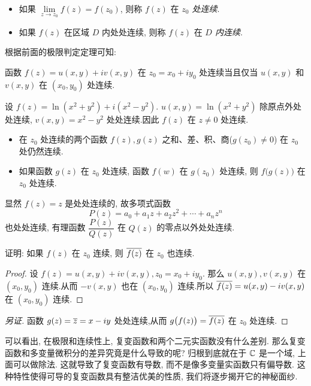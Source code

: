 \begin{definition}[连续]
  \begin{itemize}
    \item 如果 $\lim\limits_{z\to z_0}f(z)=f(z_0)$, 则称 $f(z)$ 在 \emph{$z_0$ 处连续}.
    \item 如果 $f(z)$ 在区域 $D$ 内处处连续, 则称 $f(z)$ 在 \emph{$D$ 内连续}.
  \end{itemize}
\end{definition}

根据前面的极限判定定理可知:
\begin{theorem}[连续的等价刻画]
  函数 $f(z)=u(x,y)+iv(x,y)$ 在 $z_0=x_0+iy_0$ 处连续当且仅当 $u(x,y)$ 和 $v(x,y)$ 在 $(x_0,y_0)$ 处连续.
\end{theorem}

\begin{example}
  设 $f(z)=\ln(x^2+y^2)+i(x^2-y^2)$.
  $u(x,y)=\ln(x^2+y^2)$ 除原点外处处连续, $v(x,y)=x^2-y^2$ 处处连续.因此 $f(z)$ 在 $z\neq0$ 处连续.
\end{example}

\begin{theorem}[连续函数的四则运算和复合]
  \begin{itemize}
    \item 在 $z_0$ 处连续的两个函数 $f(z),g(z)$ 之和、差、积、商($g(z_0)\neq 0$) 在 $z_0$ 处仍然连续.
    \item 如果函数 $g(z)$ 在 $z_0$ 处连续, 函数 $f(w)$ 在 $g(z_0)$ 处连续, 则 $f\bigl(g(z)\bigr)$ 在 $z_0$ 处连续.
  \end{itemize}
\end{theorem}

显然 $f(z)=z$ 是处处连续的, 故多项式函数
\[P(z)=a_0+a_1z+a_2z^2+\cdots+a_nz^n\]
也处处连续, 有理函数 $\dfrac{P(z)}{Q(z)}$ 在 $Q(z)$ 的零点以外处处连续.

\begin{example}
  证明: 如果 $f(z)$ 在 $z_0$ 连续, 则 $\overline{f(z)}$ 在 $z_0$ 也连续.
\end{example}

\begin{proof}
  设 $f(z)=u(x,y)+iv(x,y),z_0=x_0+iy_0$.
  那么 $u(x,y),v(x,y)$ 在 $(x_0,y_0)$ 连续.从而 $-v(x,y)$ 也在 $(x_0,y_0)$ 连续.所以 $\overline{f(z)}=u(x,y)-iv(x,y)$ 在 $(x_0,y_0)$ 连续.
\end{proof}
\begin{proof}[另证]
  函数 $g(z)=\overline z=x-iy$ 处处连续,从而 $g\bigl(f(z)\bigr)=\overline{f(z)}$ 在 $z_0$ 处连续.
\end{proof}

可以看出, 在极限和连续性上, 复变函数和两个二元实函数没有什么差别.
那么复变函数和多变量微积分的差异究竟是什么导致的呢?
归根到底就在于 ${\mathbb{C}}$ 是一个域, 上面可以做除法.
这就导致了复变函数有\alert{导数}, 而不是像多变量实函数只有偏导数.
这种特性使得可导的复变函数具有整洁优美的性质, 我们将逐步揭开它的神秘面纱.
